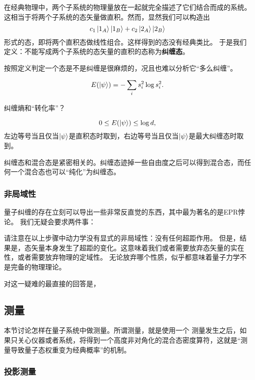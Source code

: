 \documentclass[UTF8, a4paper]{ctexart}
\begin{document}
在经典物理中，两个子系统的物理量放在一起就完全描述了它们结合而成的系统。
这相当于将两个子系统的态矢量做直积。然而，显然我们可以构造出
\[
    c_1 \ket{1_A} \ket{1_B} + c_2 \ket{2_A} \ket{2_B}
\]
形式的态，即将两个直积态做线性组合。这样得到的态没有经典类比。
于是我们定义：不能写成两个子系统的态矢量的直积的态称为\textbf{纠缠态}。

按照定义判定一个态是不是纠缠是很麻烦的，况且也难以分析它“多么纠缠”。

\begin{equation}
    E(\ket{\psi}) = - \sum_i s_i^2 \log s_i^2.
\end{equation}

纠缠熵和“转化率”？

\begin{equation}
    0 \leq E(\ket{\psi}) \leq \log d,
\end{equation}
左边等号当且仅当$\ket{\psi}$是直积态时取到，右边等号当且仅当$\ket{\psi}$是最大纠缠态时取到。

纠缠态和混合态是紧密相关的。纠缠态迹掉一些自由度之后可以得到混合态，而任何一个混合态也可以“纯化”为纠缠态。

\subsubsection{非局域性}

量子纠缠的存在立刻可以导出一些非常反直觉的东西，其中最为著名的是EPR悖论。
我们无疑会要求两件事：

请注意在以上步骤中动力学没有显式的非局域性：没有任何超距作用。
但是，结果是，态矢量本身发生了超距的变化。这意味着我们或者需要放弃态矢量的实在性，或者需要放弃物理的定域性。
无论放弃哪个性质，似乎都意味着量子力学不是完备的物理理论。

对这一疑难的最直接的回答是，

\subsection{测量}

本节讨论怎样在量子系统中做测量。所谓测量，就是使用一个
测量发生之后，如果只关心仪器或者系统，将得到一个高度非对角化的混合态密度算符，这就是“测量导致量子态权重变为经典概率”的机制。

\subsubsection{投影测量}
\end{document}
